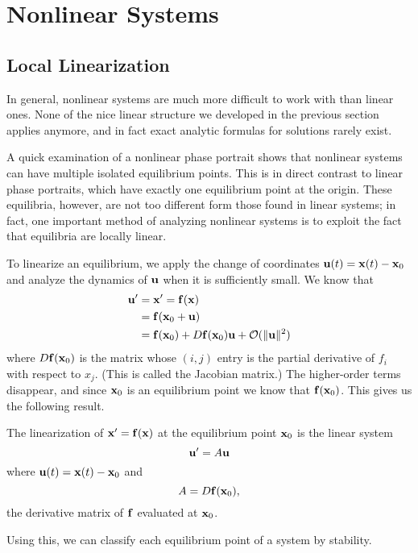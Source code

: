 \documentclass[../m082main.tex]{subfiles}
\begin{document}
\section{Nonlinear Systems}
\subsection{Local Linearization}
In general, nonlinear systems are much more difficult to work with than linear ones.
None of the nice linear structure we developed in the previous section applies anymore, and in fact exact analytic formulas for solutions rarely exist.

A quick examination of a nonlinear phase portrait shows that nonlinear systems can have multiple isolated equilibrium points.
This is in direct contrast to linear phase portraits, which have exactly one equilibrium point at the origin.
These equilibria, however, are not too different form those found in linear systems; in fact, one important method of analyzing nonlinear systems is to exploit the fact that equilibria are locally linear.

To linearize an equilibrium, we apply the change of coordinates $\mathbf{u}(t) = \mathbf{x}(t) - \mathbf{x}_0$ and analyze the dynamics of $\mathbf{u}$ when it is sufficiently small.
We know that
\begin{align*}
    \mathbf{u}' &= \mathbf{x}'= \mathbf{f} (\mathbf{x}) \\
    &= \mathbf{f} (\mathbf{x}_0 + \mathbf{u}) \\
    &= \mathbf{f} (\mathbf{x}_0) + D \mathbf{f} (\mathbf{x}_0) \mathbf{u} + \mathcal{O} (\|\mathbf{u}\|^2)
\end{align*}
where $D \mathbf{f} (\mathbf{x}_0)$ is the matrix whose $(i,j)$ entry is the partial derivative of $f_i$ with respect to $x_j$.
(This is called the Jacobian matrix.)
The higher-order terms disappear, and since $\mathbf{x}_0$ is an equilibrium point we know that $\mathbf{f}(\mathbf{x}_0)$.
This gives us the following result.

\begin{theorem}
    The linearization of $\mathbf{x}'= \mathbf{f} (\mathbf{x})$ at the equilibrium point $\mathbf{x}_0$ is the linear system
    \[ \mathbf{u}' = A \mathbf{u} \]
    where $\mathbf{u}(t) = \mathbf{x}(t) - \mathbf{x}_0$ and
    \[ A = D \mathbf{f} (\mathbf{x}_0), \]
    the derivative matrix of $\mathbf{f}$ evaluated at $\mathbf{x}_0$.
\end{theorem}

Using this, we can classify each equilibrium point of a system by stability.
\end{document}

